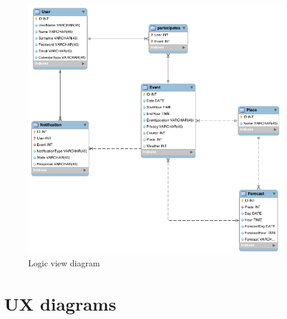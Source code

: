 \documentclass[10pt,a4paper,titlepage]{article}
\begin{document}
\begin{figure}[p]
\centering
\includegraphics[width=\linewidth]{./images/Logic_view}
\caption[Logic view]{Logic view diagram}
\label{fig:Logic_view}
\end{figure}

\section{UX diagrams}
\label{sec:UXdiagrams}
\end{document}
